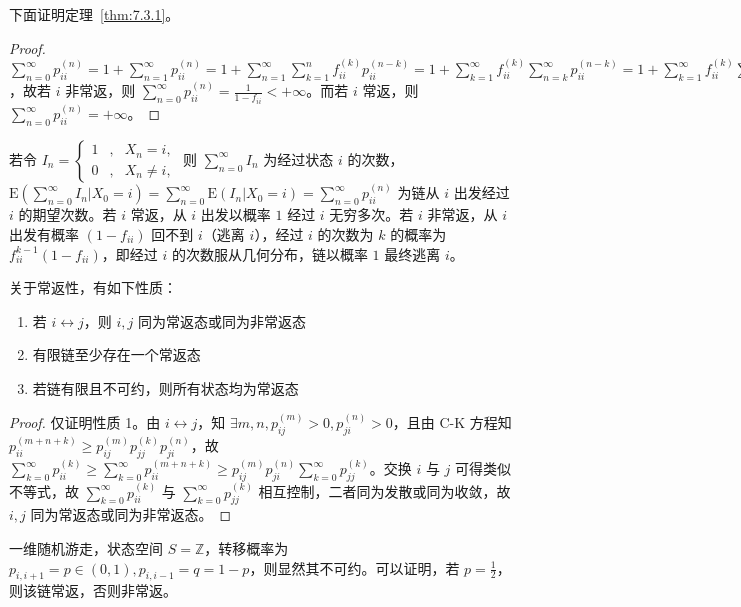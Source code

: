 \documentclass[../main.tex]{subfiles}
\begin{document}
下面证明定理~\ref{thm:7.3.1}。

\begin{proof}
    $\sum_{n=0}^\infty p_{ii}^{(n)}=1+\sum_{n=1}^\infty p_{ii}^{(n)}=1+\sum_{n=1}^\infty\sum_{k=1}^nf_{ii}^{(k)}p_{ii}^{(n-k)}=1+\sum_{k=1}^\infty f_{ii}^{(k)}\sum_{n=k}^\infty p_{ii}^{(n-k)}=1+\sum_{k=1}^\infty f_{ii}^{(k)}\sum_{n=0}^\infty p_{ii}^{(n)}=1+f_{ii}\sum_{n=0}^\infty p_{ii}^{(n)}$，故若 $i$ 非常返，则 $\sum_{n=0}^\infty p_{ii}^{(n)}=\frac1{1-f_{ii}}<+\infty$。而若 $i$ 常返，则 $\sum_{n=0}^\infty p_{ii}^{(n)}=+\infty$。
\end{proof}

若令 $I_n=\left\{\begin{aligned}
        1 & , & X_n=i,     \\
        0 & , & X_n\neq i,
    \end{aligned}\right.$ 则 $\sum_{n=0}^\infty I_n$ 为经过状态 $i$ 的次数，$\mathrm E(\sum_{n=0}^\infty I_n|X_0=i)=\sum_{n=0}^\infty\mathrm E(I_n|X_0=i)=\sum_{n=0}^\infty p_{ii}^{(n)}$ 为链从 $i$ 出发经过 $i$ 的期望次数。若 $i$ 常返，从 $i$ 出发以概率 $1$ 经过 $i$ 无穷多次。若 $i$ 非常返，从 $i$ 出发有概率 $(1-f_{ii})$ 回不到 $i$（逃离 $i$），经过 $i$ 的次数为 $k$ 的概率为 $f_{ii}^{k-1}(1-f_{ii})$，即经过 $i$ 的次数服从几何分布，链以概率 $1$ 最终逃离 $i$。

\begin{theorem}\label{thm:7.3.2}
    关于常返性，有如下性质：
    \begin{enumerate}
        \item 若 $i\leftrightarrow j$，则 $i,j$ 同为常返态或同为非常返态
        \item 有限链至少存在一个常返态
        \item 若链有限且不可约，则所有状态均为常返态
    \end{enumerate}
\end{theorem}

\begin{proof}
    仅证明性质 1。由 $i\leftrightarrow j$，知 $\exists m,n,p_{ij}^{(m)}>0,p_{ji}^{(n)}>0$，且由 C-K 方程知 $p_{ii}^{(m+n+k)}\geq p_{ij}^{(m)}p_{jj}^{(k)}p_{ji}^{(n)}$，故 $\sum_{k=0}^\infty p_{ii}^{(k)}\geq\sum_{k=0}^\infty p_{ii}^{(m+n+k)}\geq p_{ij}^{(m)}p_{ji}^{(n)}\sum_{k=0}^\infty p_{jj}^{(k)}$。交换 $i$ 与 $j$ 可得类似不等式，故 $\sum_{k=0}^\infty p_{ii}^{(k)}$ 与 $\sum_{k=0}^\infty p_{jj}^{(k)}$ 相互控制，二者同为发散或同为收敛，故 $i,j$ 同为常返态或同为非常返态。
\end{proof}

\begin{example}
    一维随机游走，状态空间 $S=\mathbb Z$，转移概率为 $p_{i,i+1}=p\in(0,1),p_{i,i-1}=q=1-p$，则显然其不可约。可以证明，若 $p=\frac12$，则该链常返，否则非常返。
\end{example}
\end{document}
